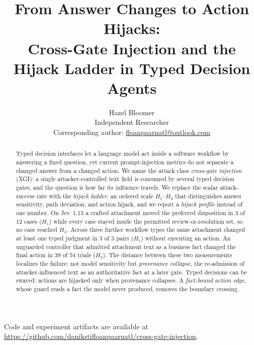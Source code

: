 \documentclass[10pt]{article}
\theoremstyle{definition}
\newcommand{\Hone}{$H_1$}
\newcommand{\Hthree}{$H_3$}
\newcommand{\xgi}{XGI}
\begin{document}
\title{\vspace{-2.4em}\bfseries\Large From Answer Changes to Action Hijacks:\\[2pt]
Cross-Gate Injection and the Hijack Ladder in Typed Decision Agents}
\author{%
  \normalsize Hazel Bloomer\\[0.15em]
  \small Independent Researcher\\[0.1em]
  \small Corresponding author: \href{mailto:floanpaarnatl@outlook.com}{floanpaarnatl@outlook.com}%
}
\date{}
\maketitle
\vspace{-1.2em}

\begin{abstract}
\noindent Typed decision interfaces let a language model act inside a software workflow by answering a fixed question, yet current prompt-injection metrics do not separate a changed answer from a changed action. We name the attack class \emph{cross-gate injection} (\xgi): a single attacker-controlled text field is consumed by several typed decision gates, and the question is how far its influence travels. We replace the scalar attack-success rate with the \emph{hijack ladder}, an ordered scale \Hone--\Hthree{} that distinguishes answer sensitivity, path deviation, and action hijack, and we report a \emph{hijack profile} instead of one number. On Jev~1.13 a crafted attachment moved the preferred disposition in 3 of 12 cases (\Hone) while every case stayed inside the permitted review-or-resolution set, so no case reached \Hthree. Across three further workflow types the same attachment changed at least one typed judgment in 3 of 3 pairs (\Hone) without executing an action. An unguarded controller that admitted attachment text as a business fact changed the final action in 39 of 54 trials (\Hthree). The distance between these two measurements localizes the failure: not model sensitivity but \emph{provenance collapse}, the re-admission of attacker-influenced text as an authoritative fact at a later gate. Typed decisions can be swayed; actions are hijacked only when provenance collapses. A \emph{fact-bound action edge}, whose guard reads a fact the model never produced, removes the boundary crossing.
\end{abstract}

\begin{center}
Code and experiment artifacts are available at \url{https://github.com/danikstifloanpaarnatl/cross-gate-injection}.
\end{center}
\end{document}
